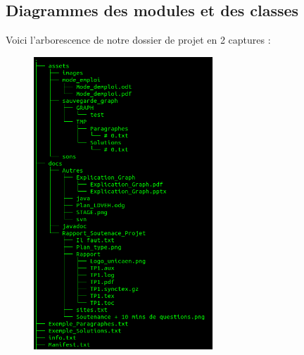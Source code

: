 \documentclass[12pt]{article}
\begin{document}
\subsection{Diagrammes des modules et des classes}
Voici l'arborescence de notre dossier de projet en 2 captures :
\begin{figure}[h]
  \centering
    \includegraphics[width=0.6\textwidth]{Tree1}
    
\end{figure}
\clearpage
\end{document}
